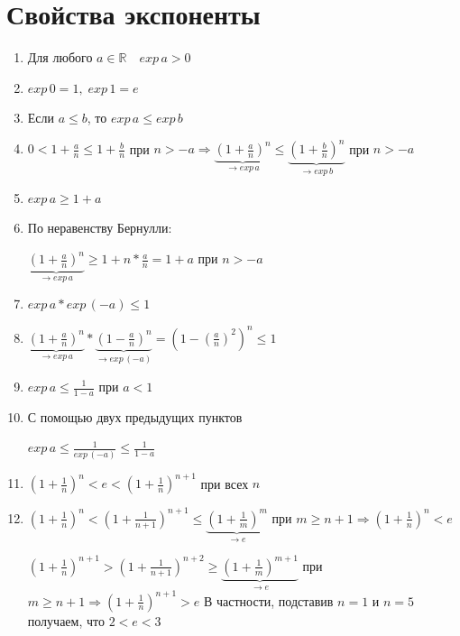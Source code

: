 \documentclass[12pt,letterpaper]{report}
\makeatletter
\theoremstyle{definition}
\renewenvironment{proof}[1][\proofname]{%
   \par\pushQED{\qed}\normalfont%
   \topsep6\p@\@plus6\p@\relax
   \trivlist\item[\hskip\labelsep\bfseries#1\@addpunct{.}]%
   \ignorespaces
}{%
   \popQED\endtrivlist\@endpefalse
}
\makeatother
\begin{document}
    \section{Свойства экспоненты}
    \begin{enumerate}
        \item Для любого $a \in \mathbb{R} \quad exp\,a > 0$
        \item $exp\,0 = 1,\; exp\,1 = e$
        \item Если $a \leqslant b$, то $exp\,a \leqslant exp\,b$
        \begin{proof}
            $0 < 1 + \frac{a}{n} \leqslant 1 + \frac{b}{n}$ при $n > -a \Rightarrow \underbrace{(1 + \frac{a}{n})^n}_{\to exp\,a} \leqslant \underbrace{(1 + \frac{b}{n})^n}_{\to exp\,b}$ при $n > -a$
        \end{proof}
        \item $exp\,a \geqslant 1 + a$
        \begin{proof}
            По неравенству Бернулли:
            
            $\underbrace{(1 + \frac{a}{n})^n}_{\to exp\,a} \geqslant 1 + n * \frac{a}{n} = 1 + a$ при $n > -a$
        \end{proof}
        \item $exp\,a * exp\,(-a) \leqslant 1$
        \begin{proof}
            $\underbrace{(1 + \frac{a}{n})^n}_{\to exp\,a} * \underbrace{(1 - \frac{a}{n})^n}_{\to exp\,(-a)} = (1 - (\frac{a}{n})^2)^n \leqslant 1$
        \end{proof}
        \item $exp\,a \leqslant \frac{1}{1 - a}$ при $a < 1$
        \begin{proof}
            С помощью двух предыдущих пунктов
            
            $exp\,a \leqslant\frac{1}{exp\,(-a)} \leqslant \frac{1}{1 - a}$
        \end{proof}
        \item $(1 + \frac{1}{n})^n < e < (1 + \frac{1}{n})^{n + 1}$ при всех $n$
        \begin{proof}
            $(1 + \frac{1}{n})^n < (1 + \frac{1}{n+1})^{n+1} \leqslant \underbrace{(1 + \frac{1}{m})^{m}}_{\to e}$ при $m
            \geqslant n + 1 \Rightarrow (1 + \frac{1}{n})^n < e$
            
            $(1 + \frac{1}{n})^{n + 1} > (1 + \frac{1}{n+1})^{n + 2} \geqslant \underbrace{(1 + \frac{1}{m})^{m + 1}}_{\to e}$ при $m \geqslant n + 1 \Rightarrow (1 + \frac{1}{n})^{n + 1} > e$
        \end{proof}
        В частности, подставив $n = 1$ и $n = 5$ получаем, что $2 < e < 3$
    \end{enumerate}
    
\end{document}
